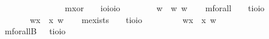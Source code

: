 \begin{isabellebody}
\ \ \ \ \ {\isachardoublequoteopen}{\isasymphi}{\isasymoplus}{\isasympsi}\ {\isasymequiv}\ \ {\isacharparenleft}{\isasymphi}{\isasymor}{\isasympsi}{\isacharparenright}\ {\isasymand}\ {\isasymnot}{\isacharparenleft}{\isasymphi}{\isasymand}{\isasympsi}{\isacharparenright}{\isachardoublequoteclose}\ \isanewline
\ \ \isamarkupfalse%
\ mxor\ \ \ {\isacharcolon}{\isacharcolon}\ {\isachardoublequoteopen}io{\isasymRightarrow}io{\isasymRightarrow}io{\isachardoublequoteclose}\ {\isacharparenleft}\isanewline
\ \ \ \ \ {\isachardoublequoteopen}{\isasymphi}\isactrlbold {\isasymoplus}{\isasympsi}\ {\isasymequiv}\ {\isasymlambda}w{\isachardot}\ {\isacharparenleft}{\isasymphi}\ w{\isacharparenright}{\isasymoplus}{\isacharparenleft}{\isasympsi}\ w{\isacharparenright}{\isachardoublequoteclose}%
\isamarkuptrue%
\ \ \isamarkupfalse%
\ mforall\ \ \ {\isacharcolon}{\isacharcolon}\ {\isachardoublequoteopen}{\isacharparenleft}{\isacharprime}t{\isasymRightarrow}io{\isacharparenright}{\isasymRightarrow}io{\isachardoublequoteclose}\ {\isacharparenleft}{\isachardoublequoteopen}\isactrlbold {\isasymforall}{\isachardoublequoteclose}{\isacharparenright}\ \ \ \ \ \ \isanewline
\ \ \ \ \ {\isachardoublequoteopen}\isactrlbold {\isasymforall}{\isasymPhi}\ {\isasymequiv}\ {\isasymlambda}w{\isachardot}{\isasymforall}x{\isachardot}\ {\isacharparenleft}{\isasymPhi}\ x\ w{\isacharparenright}{\isachardoublequoteclose}\isanewline
\ \ \isamarkupfalse%
\ mexists\ \ \ {\isacharcolon}{\isacharcolon}\ {\isachardoublequoteopen}{\isacharparenleft}{\isacharprime}t{\isasymRightarrow}io{\isacharparenright}{\isasymRightarrow}io{\isachardoublequoteclose}\ {\isacharparenleft}{\isachardoublequoteopen}\isactrlbold {\isasymexists}{\isachardoublequoteclose}{\isacharparenright}\ \isanewline
\ \ \ \ \ {\isachardoublequoteopen}\isactrlbold {\isasymexists}{\isasymPhi}\ {\isasymequiv}\ {\isasymlambda}w{\isachardot}{\isasymexists}x{\isachardot}\ {\isacharparenleft}{\isasymPhi}\ x\ w{\isacharparenright}{\isachardoublequoteclose}\isanewline
\ \ \ \ \isanewline
\ \ \isamarkupfalse%
\ mforallB\ \ {\isacharcolon}{\isacharcolon}\ {\isachardoublequoteopen}{\isacharparenleft}{\isacharprime}t{\isasymRightarrow}io{\isacharparenright}{\isasymRightarrow}io{\isachardoublequoteclose}\ {\isacharparenleft}\ %

\end{isabellebody}
